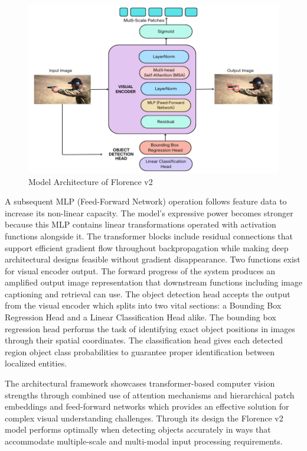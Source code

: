 \documentclass[fleqn,10pt,lineno]{wlpeerj}
\begin{document}
\begin{figure}[H]
    \centering
    \includegraphics[width=0.75\linewidth]{florence_architecture.png}
    \caption{Model Architecture of Florence v2}
    \label{fig:florence-arch}
\end{figure}

A subsequent MLP (Feed-Forward Network) operation follows feature data to increase its non-linear capacity. The model's expressive power becomes stronger because this MLP contains linear transformations operated with activation functions alongside it. 
The transformer blocks include residual connections that support efficient gradient flow throughout backpropagation while making deep architectural designs feasible without gradient disappearance. Two functions exist for visual encoder output. The forward progress of the system produces an amplified output image representation that downstream functions including image captioning and retrieval can use. The object detection head accepts the output from the visual encoder which splits into two vital sections: a Bounding Box Regression Head and a Linear Classification Head alike. The bounding box regression head performs the task of identifying exact object positions in 
images through their spatial coordinates. The classification head gives each detected region object class probabilities to guarantee proper identification between localized entities. 

The architectural framework showcases transformer-based computer vision strengths through combined use of attention mechanisms and hierarchical patch embeddings and feed-forward networks which
provides an effective solution for complex visual understanding challenges. Through its design the Florence v2 model performs optimally when detecting objects accurately in ways that accommodate multiple-scale and multi-modal input processing requirements.
\end{document}
